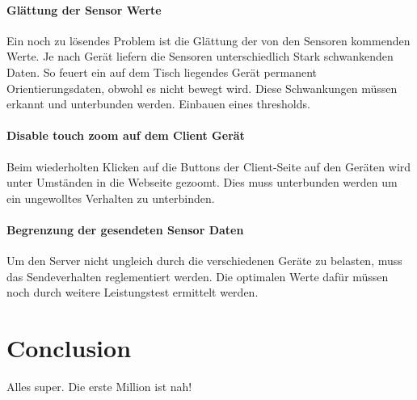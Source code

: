\documentclass[a4paper]{spie}  %
\begin{document}
\paragraph{Glättung der Sensor Werte}  %
Ein noch zu lösendes Problem ist die Glättung der von den Sensoren kommenden Werte. Je nach Gerät liefern die Sensoren unterschiedlich Stark schwankenden Daten. So feuert ein auf dem Tisch liegendes Gerät permanent Orientierungsdaten, obwohl es nicht bewegt wird. Diese Schwankungen müssen erkannt und unterbunden werden. Einbauen eines thresholds.

\paragraph{Disable touch zoom auf dem Client Gerät} %
Beim wiederholten Klicken auf die Buttons der Client-Seite auf den Geräten wird unter Umständen in die Webseite gezoomt. Dies muss unterbunden werden um ein ungewolltes Verhalten zu unterbinden.

\paragraph{Begrenzung der gesendeten Sensor Daten} %
Um den Server nicht ungleich durch die verschiedenen Geräte zu belasten, muss das Sendeverhalten reglementiert werden. Die optimalen Werte dafür müssen noch durch weitere Leistungstest ermittelt werden.


\section{Conclusion} %
Alles super. Die erste Million ist nah!





\newpage
\appendix
\end{document}
